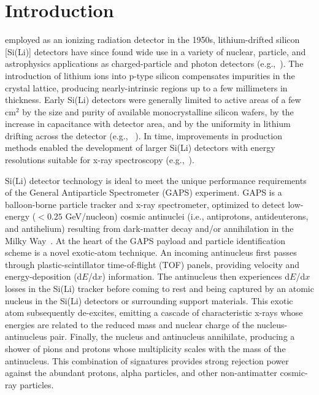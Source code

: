 \documentclass[journal]{IEEEtran}
\begin{document}
\section{Introduction}
% 
% 
% 
% 
 employed as an ionizing radiation detector in the 1950s, lithium-drifted silicon [Si(Li)] detectors have since found wide use in a variety of nuclear, particle, and astrophysics applications as charged-particle and photon detectors (e.g.,~\cite{Ahmad:1974,Krimigis:1977a,Giacconi:1979,Gerbier:1990,Roberts:1995,Stone:1998a,Popeko:2008,Gurov:2010,PhysRevLett.104.123001,Aseev:2011,Derbin:2012}). The introduction of lithium ions into p-type silicon compensates impurities in the crystal lattice, producing nearly-intrinsic regions up to a few millimeters in thickness. Early Si(Li) detectors were generally limited to active areas of a few cm$^2$ by the size and purity of available monocrystalline silicon wafers, by the increase in capacitance with detector area, and by the uniformity in lithium drifting across the detector (e.g., ~\cite{Yoshimori:1975a}). In time, improvements in production methods enabled the development of larger Si(Li) detectors with energy resolutions suitable for x-ray spectroscopy (e.g.,~\cite{PEHL1986519,FONG1982623}).
%
\par Si(Li) detector technology is ideal to meet the unique performance requirements of the General Antiparticle Spectrometer (GAPS) experiment. GAPS is a balloon-borne particle tracker and x-ray spectrometer, optimized to detect low-energy (${<}0.25$ GeV/nucleon) cosmic antinuclei (i.e., antiprotons, antideuterons, and antihelium) resulting from dark-matter decay and/or annihilation in the Milky Way~\cite{Mori:2001dv,Hailey:2009a,Aramaki:2014oda,Hailey:2013a,Aramaki:2015laa,vonDoetinchem:2020vbj,Saffold:2020axg,GAPS:2022ncd}. At the heart of the GAPS payload and particle identification scheme is a novel exotic-atom technique. An incoming antinucleus first passes through plastic-scintillator time-of-flight (TOF) panels, providing velocity and energy-deposition (d$E$/d$x$) information. The antinucleus then experiences d$E$/d$x$ losses in the Si(Li) tracker before coming to rest and being captured by an atomic nucleus in the Si(Li) detectors or surrounding support materials. This exotic atom subsequently de-excites, emitting a cascade of characteristic x-rays whose energies are related to the reduced mass and nuclear charge of the nucleus-antinucleus pair. Finally, the nucleus and antinucleus annihilate, producing a shower of pions and protons whose multiplicity scales with the mass of the antinucleus. This combination of signatures provides strong rejection power against the abundant protons, alpha particles, and other non-antimatter cosmic-ray particles.
\end{document}
